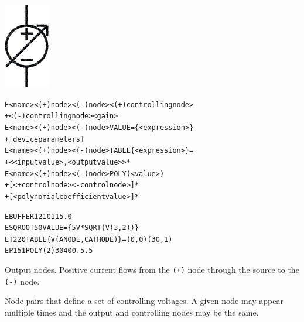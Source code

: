 


\begin{Device}\label{E_DEVICE}

\symbol
{\includegraphics{vcvsSymbol}}

\device
\begin{alltt}
E<name> <(+) node> <(-) node> <(+) controlling node>
+ <(-) controlling node> <gain>
E<name> <(+) node> <(-) node> VALUE = \{ <expression> \}  
+ [device parameters]
E<name> <(+) node> <(-) node> TABLE \{ <expression> \} = 
+ < <input value>,<output value> >*
E<name> <(+) node> <(-) node> POLY(<value>) 
+ [<+ control node> <- control node>]*
+ [<polynomial coefficient value>]*
\end{alltt}

\examples
\begin{alltt}
EBUFFER 1 2 10 11 5.0
ESQROOT   5   0 VALUE = \{5V*SQRT(V(3,2))\}
ET2 2 0 TABLE \{V(ANODE,CATHODE)\} = (0,0) (30,1)
EP1 5 1 POLY(2) 3 0 4 0 0 .5 .5
\end{alltt}

\parameters

\begin{Parameters}


Output nodes. Positive current flows from the \texttt{(+)} node through
the source to the \texttt{(-)} node.


Node pairs that define a set of controlling voltages. A given node may
appear multiple times and the output and controlling nodes may be the
same.



\end{Parameters}
\end{Device}
